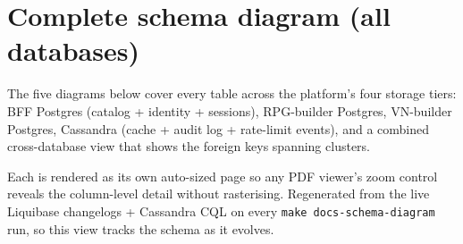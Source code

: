 \documentclass[11pt,a4paper,openany]{book}
\begin{document}
\chapter{Complete schema diagram (all databases)}

The five diagrams below cover every table across the platform's four
storage tiers: BFF Postgres (catalog + identity + sessions),
RPG-builder Postgres, VN-builder Postgres, Cassandra (cache + audit
log + rate-limit events), and a combined cross-database view that
shows the foreign keys spanning clusters.

Each is rendered as its own auto-sized page so any PDF viewer's zoom
control reveals the column-level detail without rasterising.
Regenerated from the live Liquibase changelogs + Cassandra CQL on
every \texttt{make docs-schema-diagram} run, so this view tracks the
schema as it evolves.


\end{document}
